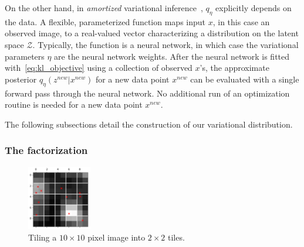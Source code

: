 
On the other hand, 
in {\itshape amortized} variational
inference~\citep{kingma2013autoencoding, rezende2014stochastic}, $q_\eta$ explicitly depends on the data. 
A flexible, parameterized function maps input $x$, in this case an observed image, to a real-valued vector characterizing a distribution on the latent space $\mathcal{Z}$. 
Typically, the function is a neural network, in which case the variational parameters $\eta$ are the neural network weights. 
After the neural network is fitted with~\eqref{eq:kl_objective} using a collection of observed $x$'s, the approximate posterior $q_\eta(z^{new} | x^{new})$ for a new data point 
$x^{new}$ can be evaluated with a single forward pass through the neural network. 
No additional run of an optimization routine is needed for a new data point $x^{new}$. 

The following subsections detail the construction of our variational distribution.


\subsubsection{The factorization}
\label{sec:factorization}


\begin{figure}[tb]
    \centering
    \includegraphics[width = 0.25\textwidth]{figures/vi_figures/example_tiled_less_whitespace.png}
    \caption{Tiling a $10 \times 10$ pixel image into $2 \times 2$ tiles.}
    \label{fig:ex_tiles}
\end{figure}

